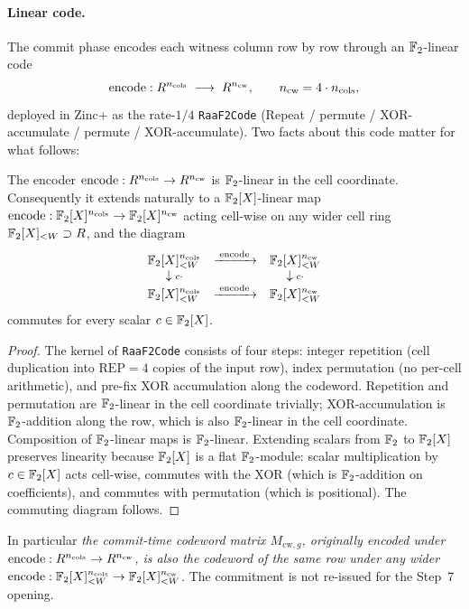 \paragraph{Linear code.} The commit phase encodes each witness column
row by row through an $\mathbb{F}_2$-linear code
\[
  \operatorname{encode} : R^{n_{\mathrm{cols}}} \;\longrightarrow\;
            R^{n_{\mathrm{cw}}}, \qquad n_{\mathrm{cw}} = 4\cdot n_{\mathrm{cols}},
\]
deployed in Zinc+ as the rate-$1/4$ \texttt{RaaF2Code} (Repeat /
permute / XOR-accumulate / permute / XOR-accumulate). Two facts about
this code matter for what follows:

\begin{lemma}
\label{lem:f2x-linearity}
The encoder $\operatorname{encode} : R^{n_{\mathrm{cols}}} \to
R^{n_{\mathrm{cw}}}$ is $\mathbb{F}_2$-linear in the cell
coordinate. Consequently it extends naturally to a
$\mathbb{F}_2[X]$-linear map
$\operatorname{encode} : \mathbb{F}_2[X]^{n_{\mathrm{cols}}} \to
\mathbb{F}_2[X]^{n_{\mathrm{cw}}}$ acting cell-wise on any wider cell
ring $\mathbb{F}_2[X]_{<W} \supset R$, and the diagram
\[
  \begin{array}{ccc}
    \mathbb{F}_2[X]_{<W}^{n_{\mathrm{cols}}} & \xrightarrow{\;\operatorname{encode}\;} & \mathbb{F}_2[X]_{<W}^{n_{\mathrm{cw}}} \\
    \downarrow{\scriptstyle c \cdot} & & \downarrow{\scriptstyle c \cdot} \\
    \mathbb{F}_2[X]_{<W}^{n_{\mathrm{cols}}} & \xrightarrow{\;\operatorname{encode}\;} & \mathbb{F}_2[X]_{<W}^{n_{\mathrm{cw}}}
  \end{array}
\]
commutes for every scalar $c \in \mathbb{F}_2[X]$.
\end{lemma}

\begin{proof}
The kernel of \texttt{RaaF2Code} consists of four steps: integer
repetition (cell duplication into $\mathrm{REP}=4$ copies of the input
row), index permutation (no per-cell arithmetic), and pre-fix XOR
accumulation along the codeword. Repetition and permutation are
$\mathbb{F}_2$-linear in the cell coordinate trivially; XOR-accumulation is
$\mathbb{F}_2$-addition along the row, which is also $\mathbb{F}_2$-linear in the
cell coordinate. Composition of $\mathbb{F}_2$-linear maps is $\mathbb{F}_2$-linear.
Extending scalars from $\mathbb{F}_2$ to $\mathbb{F}_2[X]$ preserves linearity
because $\mathbb{F}_2[X]$ is a flat $\mathbb{F}_2$-module: scalar multiplication by
$c \in \mathbb{F}_2[X]$ acts cell-wise, commutes with the XOR (which is
$\mathbb{F}_2$-addition on coefficients), and commutes with permutation
(which is positional). The commuting diagram follows.
\end{proof}

In particular \emph{the commit-time codeword matrix
$M_{\mathrm{cw}, g}$, originally encoded under
$\operatorname{encode} : R^{n_{\mathrm{cols}}} \to
R^{n_{\mathrm{cw}}}$, is also the codeword of the same row
under any wider $\operatorname{encode} : \mathbb{F}_2[X]_{<W}^{n_{\mathrm{cols}}} \to
\mathbb{F}_2[X]_{<W}^{n_{\mathrm{cw}}}$.} The commitment is not re-issued
for the Step~7 opening.
